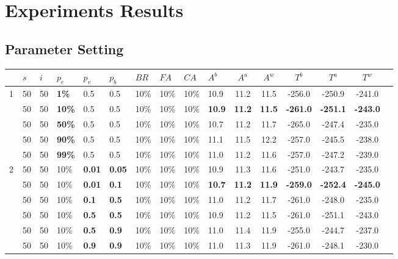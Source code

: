 \chapter{Experiments Results}
\label{appendixC}

\section{Parameter Setting}
\begin{sidewaystable}
    \centering
	\begin{tabular}{|l|l|l|l|l|l|l|l|l|l||c|c|c|c|c|c|}
 	\hline
    ~ & $s$ & $i$ & $p_{e}$ & $p_{v}$ & $p_{b}$ & $BR$ & $FA$ & $CA$ & $A^b$ & $A^a$ & $A^w$ & $T^b$ & $T^a$ & $T^w$\\
    \hline
    1 & 50 & 50 & \textbf{1\%} & 0.5 & 0.5 & 10\% & 10\% & 10\% & 10.9 & 11.2 & 11.5 & -256.0 & -250.9 & -241.0  \\
    ~ & 50 & 50 & \textbf{10\%} & 0.5 & 0.5 & 10\% & 10\% & 10\% & \textbf{10.9} & \textbf{11.2} & \textbf{11.5} & \textbf{-261.0} & \textbf{-251.1} & \textbf{-243.0} \\
    ~ & 50 & 50 & \textbf{50\%} & 0.5 & 0.5 & 10\% & 10\% & 10\% & 10.7 & 11.2 & 11.7 & -265.0 & -247.4 & -235.0  \\
    ~ & 50 & 50 & \textbf{90\%} & 0.5 & 0.5 & 10\% & 10\% & 10\% & 11.1 & 11.5 & 12.2 & -257.0 & -245.5 & -238.0  \\
    ~ & 50 & 50 & \textbf{99\%} & 0.5 & 0.5 & 10\% & 10\% & 10\% & 11.0 & 11.2 & 11.6 & -257.0 & -247.2 & -239.0  \\
    \hline
    2 & 50 & 50 & 10\% & \textbf{0.01} & \textbf{0.05} & 10\% & 10\% & 10\% & 10.9 & 11.3 & 11.6 & -251.0 & -243.7 & -235.0 \\
    ~ & 50 & 50 & 10\% & \textbf{0.01} & \textbf{0.1} & 10\% & 10\% & 10\% & \textbf{10.7} & \textbf{11.2} & \textbf{11.9} & \textbf{-259.0} & \textbf{-252.4} & \textbf{-245.0} \\
    ~ & 50 & 50 & 10\% & \textbf{0.1} & \textbf{0.5} & 10\% & 10\% & 10\% & 11.0 & 11.2 & 11.7 & -261.0 & -248.0 & -235.0 \\
    ~ & 50 & 50 & 10\% & \textbf{0.5} & \textbf{0.5} & 10\% & 10\% & 10\% & 10.9 & 11.2 & 11.5 & -261.0 & -251.1 & -243.0 \\
    ~ & 50 & 50 & 10\% & \textbf{0.5} & \textbf{0.9} & 10\% & 10\% & 10\% & 11.0 & 11.4 & 11.9 & -255.0 & -244.7 & -237.0 \\
    ~ & 50 & 50 & 10\% & \textbf{0.9} & \textbf{0.9} & 10\% & 10\% & 10\% & 11.0 & 11.3 & 11.9 & -261.0 & -248.1 & -230.0 \\

\end{tabular}
\end{sidewaystable}
